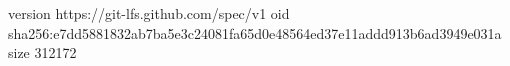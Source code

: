 version https://git-lfs.github.com/spec/v1
oid sha256:e7dd5881832ab7ba5e3c24081fa65d0e48564ed37e11addd913b6ad3949e031a
size 312172
